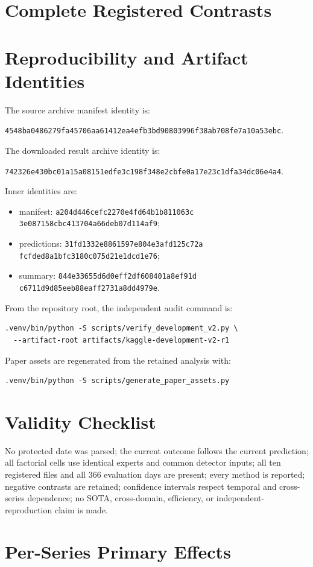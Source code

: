\documentclass[10pt]{article}
\begin{document}
\section{Complete Registered Contrasts}



\section{Reproducibility and Artifact Identities}

The source archive manifest identity is:
\par\noindent\texttt{4548ba0486279fa45706aa61412ea4efb3bd90803996f38ab708fe7a10a53ebc}.\par
The downloaded result archive identity is:
\par\noindent\texttt{742326e430bc01a15a08151edfe3c198f348e2cbfe0a17e23c1dfa34dc06e4a4}.\par
Inner identities are:
\begin{itemize}[leftmargin=*]
  \item manifest:
  \texttt{a204d446cefc2270}\allowbreak\texttt{e4fd64b1b811063c}\allowbreak
  \texttt{3e087158cbc41370}\allowbreak\texttt{4a66deb07d114af9};
  \item predictions:
  \texttt{31fd1332e8861597}\allowbreak\texttt{e804e3afd125c72a}\allowbreak
  \texttt{fcfded8a1bfc3180}\allowbreak\texttt{c075d21e1dcd1e76};
  \item summary:
  \texttt{844e33655d6d0eff}\allowbreak\texttt{2df608401a8ef91d}\allowbreak
  \texttt{c6711d9d85eeb88e}\allowbreak\texttt{aff2731a8dd4979e}.
\end{itemize}
From the repository root, the independent audit command is:
\begin{verbatim}
.venv/bin/python -S scripts/verify_development_v2.py \
  --artifact-root artifacts/kaggle-development-v2-r1
\end{verbatim}
Paper assets are regenerated from the retained analysis with:
\begin{verbatim}
.venv/bin/python -S scripts/generate_paper_assets.py
\end{verbatim}

\section{Validity Checklist}

No protected date was parsed; the current outcome follows the current prediction;
all factorial cells use identical experts and common detector inputs; all ten
registered files and all 366 evaluation days are present; every method is reported;
negative contrasts are retained; confidence intervals respect temporal and
cross-series dependence; no SOTA, cross-domain, efficiency, or independent-
reproduction claim is made.

\section{Per-Series Primary Effects}


\end{document}

